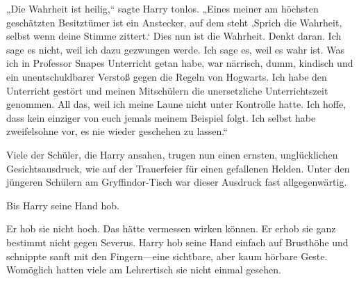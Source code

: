 „Die Wahrheit ist heilig,“ sagte Harry tonlos. „Eines meiner am höchsten geschätzten Besitztümer ist ein Anstecker, auf dem steht ‚Sprich die Wahrheit, selbst wenn deine Stimme zittert.‘ Dies nun ist die Wahrheit. Denkt daran. Ich sage es nicht, weil ich dazu gezwungen werde. Ich sage es, weil es wahr ist. Was ich in Professor Snapes Unterricht getan habe, war närrisch, dumm, kindisch und ein unentschuldbarer Verstoß gegen die Regeln von Hogwarts. Ich habe den Unterricht gestört und meinen Mitschülern die unersetzliche Unterrichtszeit genommen. All das, weil ich meine Laune nicht unter Kontrolle hatte. Ich hoffe, dass kein einziger von euch jemals meinem Beispiel folgt. Ich selbst habe zweifelsohne vor, es nie wieder geschehen zu lassen.“

Viele der Schüler, die Harry ansahen, trugen nun einen ernsten, unglücklichen Gesichtsausdruck, wie auf der Trauerfeier für einen gefallenen Helden. Unter den jüngeren Schülern am Gryffindor-Tisch war dieser Ausdruck fast allgegenwärtig.

Bis Harry seine Hand hob.

Er hob sie nicht hoch. Das hätte vermessen wirken können. Er erhob sie ganz bestimmt nicht gegen Severus. Harry hob seine Hand einfach auf Brusthöhe und schnippte sanft mit den Fingern—eine sichtbare, aber kaum hörbare Geste. Womöglich hatten viele am Lehrertisch sie nicht einmal gesehen.

